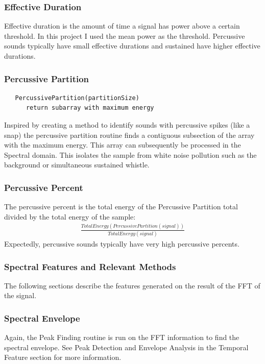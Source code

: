 \documentclass[DIV=calc, paper=a4, fontsize=11pt, twocolumn]{scrartcl}   %
\begin{document}
   \subsubsection{Effective Duration}
      Effective duration is the amount of time a signal has power above a certain threshold. In this project I used the mean power as the threshold. Percussive sounds typically have small effective durations and sustained have higher effective durations.
   \subsubsection{Percussive Partition}
   \begin{lstlisting}
   PercussivePartition(partitionSize)
      return subarray with maximum energy
   \end{lstlisting}

   Inspired by creating a method to identify sounds with percussive spikes (like a snap) the percussive partition routine finds a contiguous subsection of the array with the maximum energy. This array can subsequently be processed in the Spectral domain. This isolates the sample from white noise pollution such as the background or simultaneous sustained whistle.

   \subsubsection{Percussive Percent}
   The percussive percent is the total energy of the Percussive Partition total divided by the total energy of the sample:
    \begin{align}
      \frac{TotalEnergy(PercussivePartition(signal))}{ TotalEnergy(signal)}
   \end{align}
   Expectedly, percussive sounds typically have very high percussive percents.

\subsubsection{Spectral Features and Relevant Methods}
The following sections describe the features generated on the result of the FFT of the signal.
   \subsubsection{Spectral Envelope}
   Again, the Peak Finding routine is run on the FFT information to find the spectral envelope. See Peak Detection and Envelope Analysis in the Temporal Feature section for more information.
\end{document}
